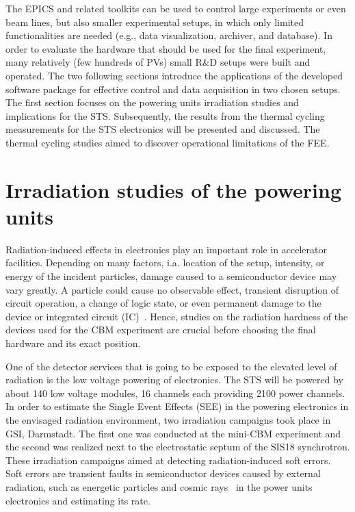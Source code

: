 The \gls{EPICS} and related toolkits can be used to control large experiments or even beam lines, but also smaller experimental setups, in which only limited functionalities are needed (e.g., data visualization, archiver, and database). In order to evaluate the hardware that should be used for the final experiment, many relatively (few hundreds of \glspl{PV}) small R\&D setups were built and operated. %
The two following sections introduce the applications of the developed software package for effective control and data acquisition in two chosen setups. The first section focuses on the powering units irradiation studies and implications for the \gls{STS}. Subsequently, the results from the thermal cycling measurements for the \gls{STS} electronics will be presented and discussed. The thermal cycling studies aimed to discover operational limitations of the \gls{FEE}. 


\section{Irradiation studies of the powering units}

Radiation-induced effects in electronics play an important role in accelerator facilities. Depending on many factors, i.a. location of the setup, intensity, or energy of the incident particles, damage caused to a semiconductor device may vary greatly. A particle could cause no observable effect, transient disruption of circuit operation, a change of logic state, or even permanent damage to the device or integrated circuit (IC)~\cite{dodd}. Hence, studies on the radiation hardness of the devices used for the \gls{CBM} experiment are crucial before choosing the final hardware and its exact position.

One of the detector services that is going to be exposed to the elevated level of radiation is the low voltage powering of electronics. The \gls{STS} will be powered by about 140 low voltage modules, 16 
channels each providing 2100 power channels. In order to estimate the Single Event Effects (\gls{SEE}) in the powering electronics in the envisaged radiation environment, two irradiation campaigns took place in \gls{GSI}, Darmstadt.  The first one was conducted at the mini-CBM experiment and the second was realized next to the electrostatic septum of the SIS18 synchrotron. These irradiation campaigns aimed at detecting radiation-induced soft errors. Soft errors are transient faults in semiconductor devices caused by external radiation, such as energetic particles and cosmic rays~\cite{6338321} in the power units electronics and estimating its rate.

